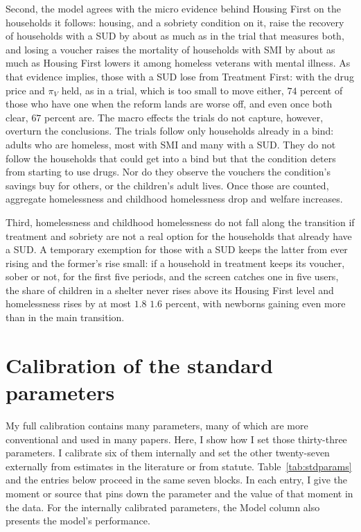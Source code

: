 \documentclass[10pt]{article}
\newcommand{\new}[1]{{\color{red}#1}}
\DeclareRobustCommand{\del}[1]{\sout{#1}}
\newif\ifshowupdates \showupdatesfalse
\newcommand{\updnum}[1]{\ifshowupdates{\color{blue}#1}\else#1\fi}
\DeclareRobustCommand{\del}[1]{\sout{#1}}
\begin{document}
Second, the model agrees with the micro evidence behind Housing First on the households it follows: housing, and a sobriety condition on it, raise the recovery of households with a SUD by about as much as in the trial that measures both, and losing a voucher raises the mortality of households with SMI by about as much as Housing First lowers it among homeless veterans with mental illness. As that evidence implies, those with a SUD lose from Treatment First: with the drug price and $\pi_V$ held, as in a trial, which is too small to move either, $74$ percent of those who have one when the reform lands are worse off, and even once both clear, \updnum{$67$} percent are. The macro effects the trials do not capture, however, overturn the conclusions. The trials follow only households already in a bind: adults who are homeless, most with SMI and many with a SUD. They do not follow the households that could get into a bind but that the condition deters from starting to use drugs. Nor do they observe the vouchers the condition's savings buy for others, or the children's adult lives. Once those are counted, aggregate homelessness and childhood homelessness drop and welfare increases.

Third, homelessness and childhood homelessness do not fall along the transition if treatment and sobriety are not a real option for the households that already have a SUD. A temporary exemption for those with a SUD keeps the latter from ever rising and the former's rise small: if a household in treatment keeps its voucher, sober or not, for the first five periods, and the screen catches one in five users, the share of children in a shelter never rises above its Housing First level and homelessness rises by at most \del{$1.8$} \new{$1.6$} percent, with newborns gaining even more than in the main transition.

\clearpage
\appendix
\setcounter{table}{0}
\section[Calibration of the standard parameters]{Calibration of the standard parameters}\label{sec:stdparams}

  My full calibration contains many parameters, many of which are more conventional and used in many papers. Here, I show how I set those thirty-three parameters. I calibrate six of them internally and set the other twenty-seven externally from estimates in the literature or from statute. Table~\ref{tab:stdparams} and the entries below proceed in the same seven blocks. In each entry, I give the moment or source that pins down the parameter and the value of that moment in the data. For the internally calibrated parameters, the Model column also presents the model's performance.
\end{document}
